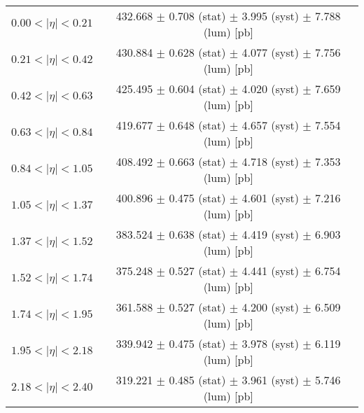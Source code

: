 \begin{tabular}{lc}
\hline
$0.00 < |\eta| <0.21$          & 432.668 $\pm$ 0.708 (stat) $\pm$ 3.995 (syst) $\pm$ 7.788 (lum) [pb]  \\
$0.21 < |\eta| <0.42$          & 430.884 $\pm$ 0.628 (stat) $\pm$ 4.077 (syst) $\pm$ 7.756 (lum) [pb]  \\
$0.42 < |\eta| <0.63$          & 425.495 $\pm$ 0.604 (stat) $\pm$ 4.020 (syst) $\pm$ 7.659 (lum) [pb]  \\
$0.63 < |\eta| <0.84$          & 419.677 $\pm$ 0.648 (stat) $\pm$ 4.657 (syst) $\pm$ 7.554 (lum) [pb]  \\
$0.84 < |\eta| <1.05$          & 408.492 $\pm$ 0.663 (stat) $\pm$ 4.718 (syst) $\pm$ 7.353 (lum) [pb]  \\
$1.05 < |\eta| <1.37$          & 400.896 $\pm$ 0.475 (stat) $\pm$ 4.601 (syst) $\pm$ 7.216 (lum) [pb]  \\
$1.37 < |\eta| <1.52$          & 383.524 $\pm$ 0.638 (stat) $\pm$ 4.419 (syst) $\pm$ 6.903 (lum) [pb]  \\
$1.52 < |\eta| <1.74$          & 375.248 $\pm$ 0.527 (stat) $\pm$ 4.441 (syst) $\pm$ 6.754 (lum) [pb]  \\
$1.74 < |\eta| <1.95$          & 361.588 $\pm$ 0.527 (stat) $\pm$ 4.200 (syst) $\pm$ 6.509 (lum) [pb]  \\
$1.95 < |\eta| <2.18$          & 339.942 $\pm$ 0.475 (stat) $\pm$ 3.978 (syst) $\pm$ 6.119 (lum) [pb]  \\
$2.18 < |\eta| <2.40$          & 319.221 $\pm$ 0.485 (stat) $\pm$ 3.961 (syst) $\pm$ 5.746 (lum) [pb]  \\
\hline
\end{tabular}
